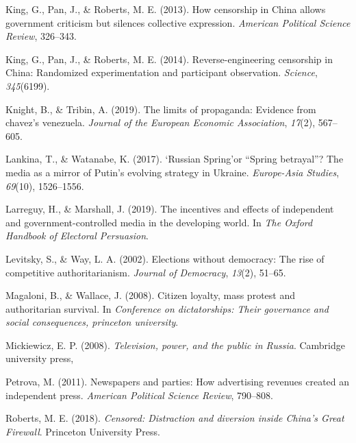 \documentclass[
  english,
  man]{apa6}
\begin{document}
\leavevmode\hypertarget{ref-kingHowCensorshipChina2013}{}%
King, G., Pan, J., \& Roberts, M. E. (2013). How censorship in China allows government criticism but silences collective expression. \emph{American Political Science Review}, 326--343.

\leavevmode\hypertarget{ref-kingReverseengineeringCensorshipChina2014}{}%
King, G., Pan, J., \& Roberts, M. E. (2014). Reverse-engineering censorship in China: Randomized experimentation and participant observation. \emph{Science}, \emph{345}(6199).

\leavevmode\hypertarget{ref-knightLimitsPropagandaEvidence2019}{}%
Knight, B., \& Tribin, A. (2019). The limits of propaganda: Evidence from chavez's venezuela. \emph{Journal of the European Economic Association}, \emph{17}(2), 567--605.

\leavevmode\hypertarget{ref-lankinaRussianSpringSpring2017}{}%
Lankina, T., \& Watanabe, K. (2017). `Russian Spring'or ``Spring betrayal''? The media as a mirror of Putin's evolving strategy in Ukraine. \emph{Europe-Asia Studies}, \emph{69}(10), 1526--1556.

\leavevmode\hypertarget{ref-larreguyIncentivesEffectsIndependent2019}{}%
Larreguy, H., \& Marshall, J. (2019). The incentives and effects of independent and government-controlled media in the developing world. In \emph{The Oxford Handbook of Electoral Persuasion}.

\leavevmode\hypertarget{ref-levitskyElectionsDemocracyRise2002}{}%
Levitsky, S., \& Way, L. A. (2002). Elections without democracy: The rise of competitive authoritarianism. \emph{Journal of Democracy}, \emph{13}(2), 51--65.

\leavevmode\hypertarget{ref-magaloniCitizenLoyaltyMass2008}{}%
Magaloni, B., \& Wallace, J. (2008). Citizen loyalty, mass protest and authoritarian survival. In \emph{Conference on dictatorships: Their governance and social consequences, princeton university}.

\leavevmode\hypertarget{ref-mickiewiczTelevisionPowerPublic2008}{}%
Mickiewicz, E. P. (2008). \emph{Television, power, and the public in Russia}. Cambridge university press,

\leavevmode\hypertarget{ref-petrovaNewspapersPartiesHow2011}{}%
Petrova, M. (2011). Newspapers and parties: How advertising revenues created an independent press. \emph{American Political Science Review}, 790--808.

\leavevmode\hypertarget{ref-robertsCensoredDistractionDiversion2018}{}%
Roberts, M. E. (2018). \emph{Censored: Distraction and diversion inside China's Great Firewall}. Princeton University Press.
\end{document}
